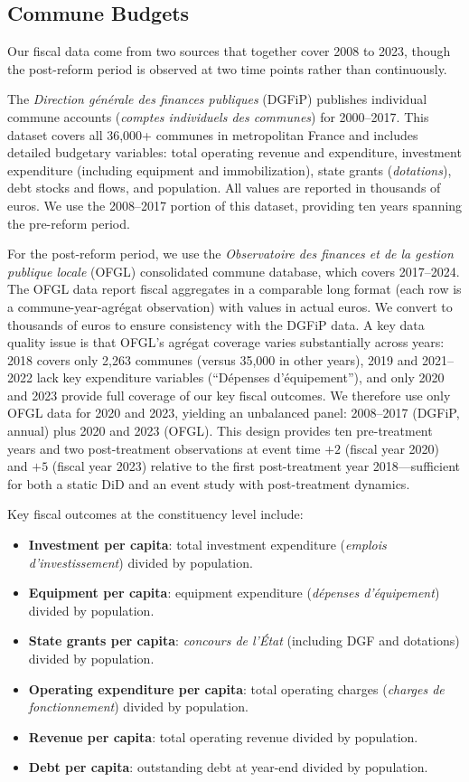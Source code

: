 \documentclass[12pt]{article}
\begin{document}
\subsection{Commune Budgets}

Our fiscal data come from two sources that together cover 2008 to 2023, though the post-reform period is observed at two time points rather than continuously.

The \textit{Direction générale des finances publiques} (DGFiP) publishes individual commune accounts (\textit{comptes individuels des communes}) for 2000--2017. This dataset covers all 36,000+ communes in metropolitan France and includes detailed budgetary variables: total operating revenue and expenditure, investment expenditure (including equipment and immobilization), state grants (\textit{dotations}), debt stocks and flows, and population. All values are reported in thousands of euros. We use the 2008--2017 portion of this dataset, providing ten years spanning the pre-reform period.

For the post-reform period, we use the \textit{Observatoire des finances et de la gestion publique locale} (OFGL) consolidated commune database, which covers 2017--2024. The OFGL data report fiscal aggregates in a comparable long format (each row is a commune-year-agrégat observation) with values in actual euros. We convert to thousands of euros to ensure consistency with the DGFiP data. A key data quality issue is that OFGL's agrégat coverage varies substantially across years: 2018 covers only 2,263 communes (versus 35,000 in other years), 2019 and 2021--2022 lack key expenditure variables (``Dépenses d'équipement''), and only 2020 and 2023 provide full coverage of our key fiscal outcomes. We therefore use only OFGL data for 2020 and 2023, yielding an unbalanced panel: 2008--2017 (DGFiP, annual) plus 2020 and 2023 (OFGL). This design provides ten pre-treatment years and two post-treatment observations at event time $+2$ (fiscal year 2020) and $+5$ (fiscal year 2023) relative to the first post-treatment year 2018---sufficient for both a static DiD and an event study with post-treatment dynamics.

Key fiscal outcomes at the constituency level include:
\begin{itemize}
    \item \textbf{Investment per capita}: total investment expenditure (\textit{emplois d'investissement}) divided by population.
    \item \textbf{Equipment per capita}: equipment expenditure (\textit{dépenses d'équipement}) divided by population.
    \item \textbf{State grants per capita}: \textit{concours de l'État} (including DGF and dotations) divided by population.
    \item \textbf{Operating expenditure per capita}: total operating charges (\textit{charges de fonctionnement}) divided by population.
    \item \textbf{Revenue per capita}: total operating revenue divided by population.
    \item \textbf{Debt per capita}: outstanding debt at year-end divided by population.
\end{itemize}
\end{document}
